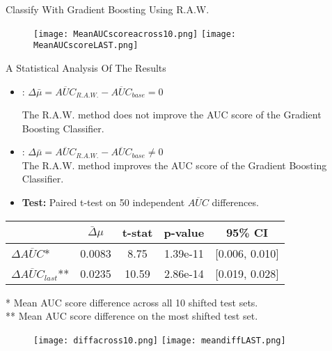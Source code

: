 \begin{frame}{Classify With Gradient Boosting Using R.A.W.}

\begin{figure}
    \centering
    \texttt{[image: MeanAUCscoreacross10.png]}
    \hfill
    \texttt{[image: MeanAUCscoreLAST.png]}
\end{figure}




\end{frame}

\begin{frame}{A Statistical Analysis Of The Results}
    \begin{itemize}
        \item {}:  $\Delta\bar\mu = \overline{AUC}_{R.A.W.} - \overline{AUC}_{base} = 0$
            
            The R.A.W. method does not improve the AUC score of the Gradient Boosting Classifier.
            
        \item {}: $\Delta\bar\mu = \overline{AUC}_{R.A.W.} - \overline{AUC}_{base}\not= 0$\\
        The R.A.W. method improves the AUC score of the Gradient Boosting Classifier.
        \item \textbf{Test:} Paired t-test on 50 independent $\overline{AUC}$ differences.
    \end{itemize}


        \begin{table}[h!]
            \centering
            \small
            \begin{tabular}{lcccc}
            \hline
            \vspace{1mm}
             & $\bar\Delta\mu$ & t-stat & p-value & 95\% CI \\
            \hline
            \vspace{1mm}
            $\Delta\overline{ AUC}$* & 0.0083 & 8.75  & 1.39e-11 & [0.006, 0.010] \\
            $\Delta\overline{ AUC}_{last}$** & 0.0235 & 10.59 & 2.86e-14 & [0.019, 0.028] \\
            \hline
            \end{tabular}
        \end{table}

    \vspace{1em}
    \begin{footnotesize}
        * Mean AUC score difference across all 10 shifted test sets.\\
        ** Mean AUC score difference on the most shifted test set.
    \end{footnotesize}

\end{frame}

\begin{frame}
    \begin{figure}
        \centering
        \texttt{[image: diffacross10.png]}
        \hfill
        \texttt{[image: meandiffLAST.png]}
    \end{figure}
\end{frame}

